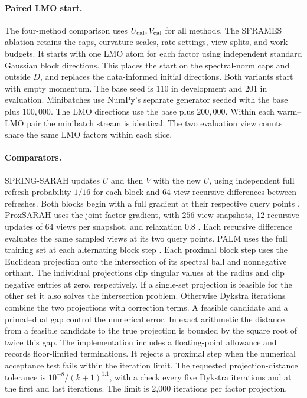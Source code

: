 \documentclass[11pt]{article}
\begin{document}
\paragraph{Paired LMO start.}
The four-method comparison uses \(U_{\rm cal},V_{\rm cal}\) for all methods. The SFRAMES ablation retains the caps, curvature scales, rate settings, view splits, and work budgets. It starts with one LMO atom for each factor using independent standard Gaussian block directions. This places the start on the spectral-norm caps and outside \(D\), and replaces the data-informed initial directions. Both variants start with empty momentum. The base seed is 110 in development and 201 in evaluation. Minibatches use NumPy's separate generator seeded with the base plus \(100{,}000\). The LMO directions use the base plus \(200{,}000\). Within each warm--LMO pair the minibatch stream is identical. The two evaluation view counts share the same LMO factors within each slice.

\paragraph{Comparators.}
SPRING-SARAH updates \(U\) and then \(V\) with the new \(U\), using independent full refresh probability \(1/16\) for each block and \(64\)-view recursive differences between refreshes. Both blocks begin with a full gradient at their respective query points \cite{spring}. ProxSARAH uses the joint factor gradient, with \(256\)-view snapshots, 12 recursive updates of \(64\) views per snapshot, and relaxation \(0.8\) \cite{proxsarah}. Each recursive difference evaluates the same sampled views at its two query points. PALM uses the full training set at each alternating block step \cite{palm}. Each proximal block step uses the Euclidean projection onto the
intersection of its spectral ball and nonnegative orthant. The individual
projections clip singular values at the radius and clip negative entries
at zero, respectively. If a single-set projection is feasible for the
other set it also solves the intersection problem. Otherwise Dykstra
iterations combine the two projections with correction terms. A feasible
candidate and a primal--dual gap control the numerical error. In exact
arithmetic the distance from a feasible candidate to the true projection
is bounded by the square root of twice this gap. The implementation
includes a floating-point allowance and records floor-limited terminations.
It rejects a proximal step when the numerical acceptance test fails within
the iteration limit. The requested projection-distance tolerance is \(10^{-8}/(k+1)^{1.1}\), with a check every five Dykstra iterations and at the first and last iterations. The limit is 2,000 iterations per factor projection.
\end{document}
